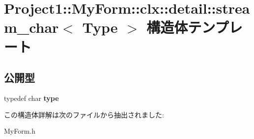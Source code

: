 \hypertarget{struct_project1_1_1_my_form_1_1clx_1_1detail_1_1stream__char}{}\section{Project1\+:\+:My\+Form\+:\+:clx\+:\+:detail\+:\+:stream\+\_\+char$<$ Type $>$ 構造体テンプレート}
\label{struct_project1_1_1_my_form_1_1clx_1_1detail_1_1stream__char}
\subsection*{公開型}
\begin{DoxyCompactItemize}
\item 
\mbox{\label{struct_project1_1_1_my_form_1_1clx_1_1detail_1_1stream__char_af3162ed23258265b5a5a3257fd258d55}} 
typedef char {\bfseries type}
\end{DoxyCompactItemize}


この構造体詳解は次のファイルから抽出されました\+:\begin{DoxyCompactItemize}
\item 
My\+Form.\+h\end{DoxyCompactItemize}
